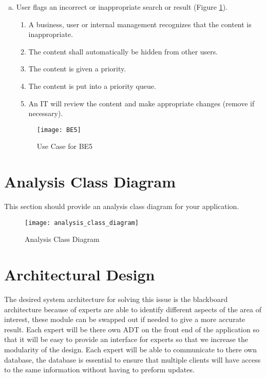 \documentclass[titlepage]{article}
\begin{document}
\begin{enumerate}[a)]
\newpage
	\item User flags an incorrect or inappropriate search or result (Figure \ref{usecase:badsearch}).
		\begin{enumerate}[{BE5}.1]
			\item A business, user or internal management recognizes that the content is inappropriate.
			\item The content shall automatically be hidden from other users.
			\item The content is given a priority.
			\item The content is put into a priority queue.
			\item An IT will review the content and make appropriate changes (remove if necessary).
		\end{enumerate}
	\begin{center}
		\begin{figure}[H]
			\texttt{[image: BE5]}
			\caption{Use Case for BE5}\label{usecase:badsearch}
		\end{figure}
	\end{center}
	
	\end{enumerate}

\newpage

\section{Analysis Class Diagram}
\label{sec:analysis_class_diagram}
This section should provide an analysis class diagram for your application.

\label{sub:system_architecture}
	\begin{center}
		\begin{figure}[H]
			\texttt{[image: analysis\_class\_diagram]}
			\caption{Analysis Class Diagram}\label{diagram:analysisclass}
		\end{figure}
	\end{center}
	


\section{Architectural Design}
\label{sec:architectural_design}
The desired system architecture for solving this issue is the blackboard architecture because of experts are able to identify different aspects of the area of interest, these module can be swapped out if needed to give a more accurate result. Each expert will be there own ADT on the front end of the application so that it will be easy to provide an interface for experts so that we increase the modularity of the design. Each expert will be able to communicate to there own database, the database is essential to ensure that multiple clients will have access to the same information without having to preform updates.
\end{document}
